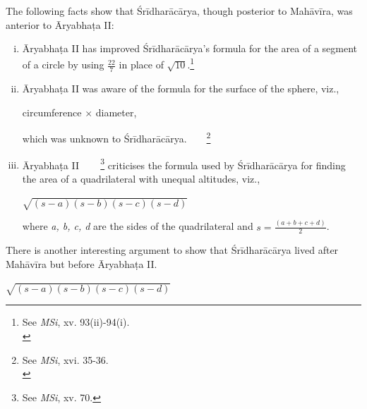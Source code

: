 \documentclass[10pt, openany]{book}
\begin{document}
 \vspace{0.3cm}
{The following facts show that Śrīdharācārya, though}
{posterior to Mahāvīra, was anterior to Āryabhaṭa II:}

\begin{enumerate}[(i)]
    \item {Āryabhaṭa II has improved Śrīdharācārya's formula}
{for the area of a segment of a circle by using $\frac{22}{7}$ in}
{place of $\sqrt{10}$.}\renewcommand{\thefootnote}{1}\footnote{\hspace{-2mm} \englishfont See \textit{MSi}, xv. 93(ii)-94(i).\\}

\item{Āryabhaṭa II was aware of the formula for the surface of the sphere, viz.,}

\hspace{6mm} {circumference $\times$ diameter,}

{which was unknown to Śrīdharācārya.}~~~~\renewcommand{\thefootnote}{\hspace{-4.5mm} 2}\footnote{\hspace{-2mm} \englishfont See \textit{MSi}, xvi. 35-36.\\}

\item{Āryabhaṭa II~\,~~~\renewcommand{\thefootnote}{\hspace{-4.5mm} 3}\footnote{\hspace{-2mm} \englishfont See \textit{MSi}, xv. 70.} criticises the formula used by Śrīdharācārya for finding the area of a quadrilateral} 
{with unequal altitudes, viz.,}

\vspace{0.1cm}
\hspace{6mm} $\sqrt{(s-a) (s-b) (s-c) (s-d)}$

where \textit{a, b, c, d} are the sides of the quadrilateral and $s = \frac{(a + b + c + d)}{2}$.
\end{enumerate}

{There is another interesting argument to show that Śrīdharācārya lived after Mahāvīra but before Āryabhaṭa II.}

\newpage

\justify\englishfont {}

\begin{center}
$\sqrt{(s-a) (s-b) (s-c) (s-d)} $
\end{center}
\end{document}
